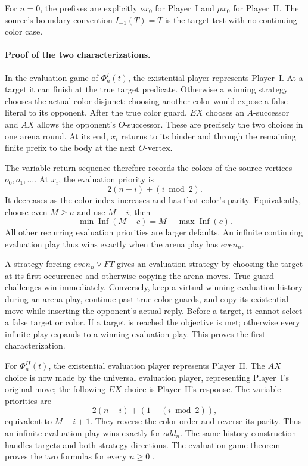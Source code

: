 For \(n=0\), the prefixes
are explicitly \(\nu x_0\)
for Player~I and
\(\mu x_0\) for Player~II.
The source's boundary
convention \(I_{-1}(T)=T\)
is the target test
with no continuing
color case.

\paragraph{Proof of the two characterizations.}
In the evaluation game
of \(\Phi_n^I(t)\),
the existential player
represents Player~I.
At a target it can
finish at the true
target predicate.
Otherwise a winning
strategy chooses the
actual color disjunct:
choosing another color
would expose a false
literal to its opponent.
After the true color
guard, \(EX\) chooses
an \(A\)-successor and
\(AX\) allows the
opponent's \(O\)-successor.
These are precisely the
two choices in one
arena round.
At its end, \(x_i\)
returns to its binder
and through the remaining
finite prefix to the
body at the next
\(O\)-vertex.

The variable-return sequence
therefore records the colors
of the source vertices
\(o_0,o_1,\ldots\).
At \(x_i\), the
evaluation priority is
\[
 2(n-i)+(i\bmod2).
\]
It decreases as the
color index increases
and has that color's
parity. Equivalently,
choose even \(M\geq n\)
and use \(M-i\);
then
\[
 \min\operatorname{Inf}(M-c)
       =M-\max\operatorname{Inf}(c).
\]
All other recurring
evaluation priorities are
larger defaults.
An infinite continuing
evaluation play thus wins
exactly when the arena
play has \(even_n\).

A strategy forcing
\(even_n\lor FT\)
gives an evaluation
strategy by choosing
the target at its
first occurrence and
otherwise copying the
arena moves.
True guard challenges
win immediately.
Conversely, keep a
virtual winning evaluation
history during an arena
play, continue past
true color guards,
and copy its existential
move while inserting the
opponent's actual reply.
Before a target, it
cannot select a false
target or color.
If a target is reached
the objective is met;
otherwise every infinite
play expands to a
winning evaluation play.
This proves the first
characterization.

For \(\Phi_n^{II}(t)\),
the existential evaluation
player represents Player~II.
The \(AX\) choice is
now made by the universal
evaluation player, representing
Player~I's original move;
the following \(EX\)
choice is Player~II's
response. The variable
priorities are
\[
 2(n-i)+(1-(i\bmod2)),
\]
equivalent to \(M-i+1\).
They reverse the color
order and reverse its
parity. Thus an infinite
evaluation play wins
exactly for \(odd_n\).
The same history construction
handles targets and both
strategy directions.
The evaluation-game theorem
proves the two formulas
for every \(n\geq0\)
\cite[thms.~4.1--4.2]{EmersonJutla1991}.

